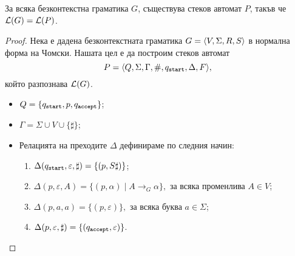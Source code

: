 

\begin{framed}
  \begin{lemma}
    За всяка безконтекстна граматика $G$,
    съществува стеков автомат $P$, такъв че $\mathcal{L}(G) = \mathcal{L}(P)$.
  \end{lemma}
\end{framed}
\begin{proof}
  Нека е дадена безконтекстната граматика $G = \langle{V,\Sigma,R,S}\rangle$ в нормална форма на Чомски.
  Нашата цел е да построим стеков автомат
  \[P = \langle{Q,\Sigma,\Gamma,\#,q_{\texttt{start}},\Delta,F}\rangle,\] който разпознава $\mathcal{L}(G)$.
  \begin{itemize}
  \item
    $Q = \{q_{\texttt{start}},p,q_{\texttt{accept}}\}$;
  \item
    $\Gamma = \Sigma \cup V \cup \{\sharp\}$;
  \item
    Релацията на преходите $\Delta$ дефинираме по следния начин:
    \begin{enumerate}[(1)]
    \item 
      $\Delta(q_{\texttt{start}}, \varepsilon, \sharp ) = \{(p,S\sharp)\}$;
    \item
      $\Delta(p,\varepsilon,A) = \{(p,\alpha)\mid A\to_G \alpha\}, \text{ за всяка променлива }A \in V$;
    \item
      $\Delta(p,a,a) = \{(p,\varepsilon)\}, \text{ за всяка буква } a \in \Sigma$;
    \item
      $\Delta(p,\varepsilon,\sharp) = \{(q_{\texttt{accept}}, \varepsilon)\}$.
    \end{enumerate}
  \end{itemize}
  

\end{proof}
